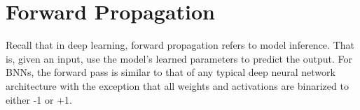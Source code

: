 %
%
%
%
%
%
%
%
%

\section{Forward Propagation}
Recall that in deep learning, forward propagation refers to model inference. That is, given an input, use the model's learned parameters to predict the output. For BNNs, the forward pass is similar to that of any typical deep neural network architecture with the exception that all weights and activations are binarized to either -1 or +1. 

